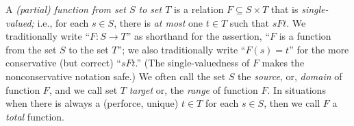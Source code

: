 A {\it (partial) function from set $S$ to set $T$} is a relation $F
\subseteq S \times T$ that is {\it single-valued;} i.e., for each $s
\in S$, there is {\em at most} one $t \in T$ such that $sFt$.  We
traditionally write ``$F: S \rightarrow T$'' as shorthand for the
assertion, ``$F$ is a function from the set $S$ to the set $T$''; we
also traditionally write ``$F(s) = t$'' for the more conservative (but
correct) ``$sFt$.''  (The single-valuedness of $F$ makes the
nonconservative notation safe.)  We often call the set $S$ the {\em
  source},  or, {\it domain}
 of function $F$, and we call set $T$ {\em
  target}  or, the {\it range}
 of function $F$.  In situations when there is
always a (perforce, unique) $t \in T$ for each $s \in S$, then we call
$F$ a {\em total} function.



